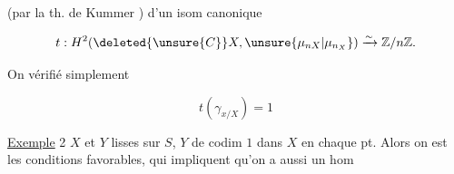 (par la th. de Kummer ) d'un isom canonique

\[
t:H^2(\deleted{\unsure{C}}X,\unsure{\mu_{nX}|\mu_{n_X}})\xrightarrow{\sim}\mathbb Z/n\mathbb Z.
\]

On  vérifié simplement

\[
t(\gamma_{x/X})=1
\]

\uline{Exemple} 2 \quad $X$ et $Y$ lisses sur $S$, $Y$ de codim $1$ dans $X$ en chaque pt. Alors on est  les conditions favorables, qui impliquent qu'on a aussi un hom


